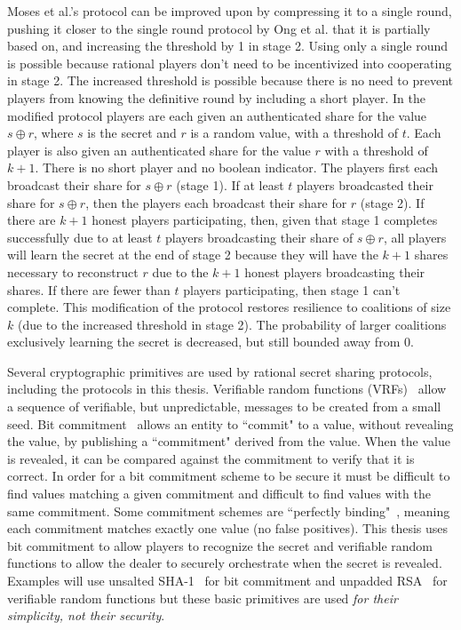 \documentclass[12pt]{dalcsthesis}
\begin{document}
Moses et al.'s protocol can be improved upon by compressing it to a single round, pushing it closer to the single round protocol by Ong et al.\cite{ong09} that it is partially based on, and increasing the threshold by 1 in stage 2. Using only a single round is possible because rational players don't need to be incentivized into cooperating in stage 2. The increased threshold is possible because there is no need to prevent players from knowing the definitive round by including a short player. In the modified protocol players are each given an authenticated share for the value $s \oplus r$, where $s$ is the secret and $r$ is a random value, with a threshold of $t$. Each player is also given an authenticated share for the value $r$ with a threshold of $k+1$. There is no short player and no boolean indicator. The players first each broadcast their share for $s \oplus r$ (stage 1). If at least $t$ players broadcasted their share for $s \oplus r$, then the players each broadcast their share for $r$ (stage 2). If there are $k+1$ honest players participating, then, given that stage 1 completes successfully due to at least $t$ players broadcasting their share of $s \oplus r$, all players will learn the secret at the end of stage 2 because they will have the $k+1$ shares necessary to reconstruct $r$ due to the $k+1$ honest players broadcasting their shares. If there are fewer than $t$ players participating, then stage 1 can't complete. This modification of the protocol restores resilience to coalitions of size $k$ (due to the increased threshold in stage 2). The probability of larger coalitions exclusively learning the secret is decreased, but still bounded away from 0.

Several cryptographic primitives are used by rational secret sharing protocols, including the protocols in this thesis. Verifiable random functions (VRFs)~\cite{dis05, micali99} allow a sequence of verifiable, but unpredictable, messages to be created from a small seed. Bit commitment~\cite{Damg02, naor91} allows an entity to ``commit" to a value, without revealing the value, by publishing a ``commitment" derived from the value. When the value is revealed, it can be compared against the commitment to verify that it is correct. In order for a bit commitment scheme to be secure it must be difficult to find values matching a given commitment and difficult to find values with the same commitment. Some commitment schemes are ``perfectly binding"~\cite{Damg02}, meaning each commitment matches exactly one value (no false positives). This thesis uses bit commitment to allow players to recognize the secret and verifiable random functions to allow the dealer to securely orchestrate when the secret is revealed. Examples will use unsalted SHA-1~\cite{sha08} for bit commitment and unpadded RSA~\cite{rsa78} for verifiable random functions but these basic primitives are used \emph{for their simplicity, not their security}.
\end{document}
